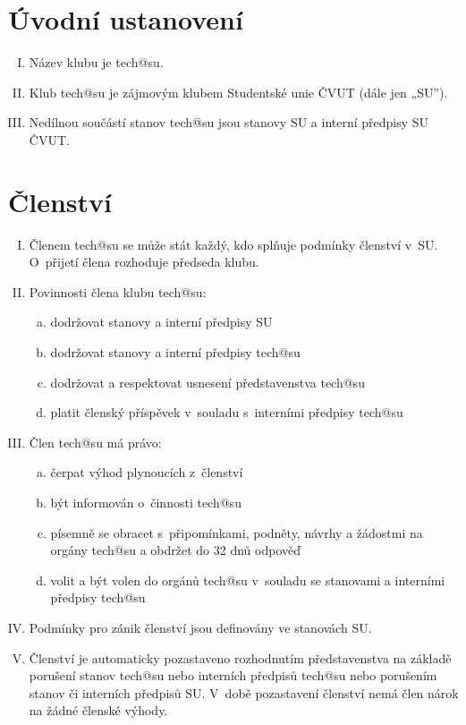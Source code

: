 \documentclass[10pt]{article}
\begin{document}
\section{Úvodní ustanovení} %
	\begin{enumerate}[I.]
	\item Název klubu je tech@su.
	\item Klub tech@su je zájmovým klubem Studentské unie ČVUT (dále jen „SU”).  
	\item Nedílnou součástí stanov tech@su jsou stanovy SU a interní předpisy SU ČVUT.
	\end{enumerate}

\section{Členství} %
	\begin{enumerate}[I.]
	\item Členem tech@su se může stát každý, kdo splňuje podmínky členství v~SU. O~přijetí člena rozhoduje předseda klubu.
	\item Povinnosti člena klubu tech@su: 
		\begin{enumerate}[a.]
		\item dodržovat stanovy a interní předpisy SU
		\item dodržovat stanovy a interní předpisy tech@su
		\item dodržovat a respektovat usnesení představenstva tech@su
		\item platit členský příspěvek v~souladu s~interními předpisy tech@su
		\end{enumerate}
	\item Člen tech@su má právo:
		\begin{enumerate}[a.]
		\item čerpat výhod plynoucích z~členství
		\item být informován o~činnosti tech@su 
		\item písemně se obracet s~připomínkami, podněty, návrhy a žádostmi na orgány tech@su a obdržet do 32 dnů odpověď
		\item volit a být volen do orgánů tech@su v~souladu se stanovami a interními předpisy tech@su
		\end{enumerate}
	\item Podmínky pro zánik členství jsou definovány ve stanovách SU.  
	\item Členství je automaticky pozastaveno rozhodnutím představenstva na základě porušení stanov tech@su nebo interních předpisů tech@su nebo porušením stanov či interních předpisů SU. V~době pozastavení členství nemá člen nárok na žádné členské výhody.     
	\end{enumerate}
\end{document}
